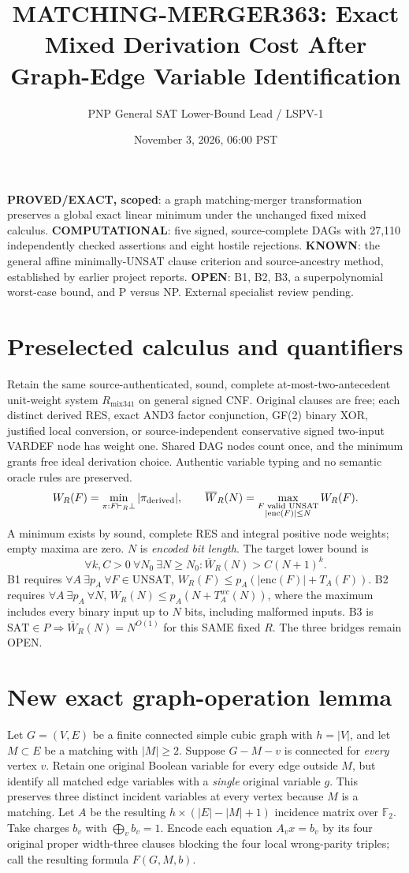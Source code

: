 \documentclass[11pt]{article}
\title{MATCHING-MERGER363: Exact Mixed Derivation Cost After Graph-Edge Variable Identification}
\author{PNP General SAT Lower-Bound Lead / LSPV-1}
\date{November 3, 2026, 06:00 PST}
\begin{document}
\maketitle
\noindent\textbf{PROVED/EXACT, scoped}: a graph matching-merger transformation preserves a global exact linear minimum under the unchanged fixed mixed calculus. \textbf{COMPUTATIONAL}: five signed, source-complete DAGs with 27,110 independently checked assertions and eight hostile rejections. \textbf{KNOWN}: the general affine minimally-UNSAT clause criterion and source-ancestry method, established by earlier project reports. \textbf{OPEN}: B1, B2, B3, a superpolynomial worst-case bound, and P versus NP. External specialist review pending.

\section*{Preselected calculus and quantifiers}
Retain the same source-authenticated, sound, complete at-most-two-antecedent unit-weight system \(R_{\mathrm{mix341}}\) on general signed CNF. Original clauses are free; each distinct derived RES, exact AND3 factor conjunction, GF(2) binary XOR, justified local conversion, or source-independent conservative signed two-input VARDEF node has weight one. Shared DAG nodes count once, and the minimum grants free ideal derivation choice. Authentic variable typing and no semantic oracle rules are preserved.
\[
 W_R(F)=\min_{\pi:F\vdash_R\bot}|\pi_{\rm derived}|,\qquad
 \overline W_R(N)=\max_{\substack{F\text{ valid UNSAT}\\|\mathrm{enc}(F)|\le N}}W_R(F).
\]
A minimum exists by sound, complete RES and integral positive node weights; empty maxima are zero. \(N\) is \emph{encoded bit length}. The target lower bound is
\[
 \forall k,C>0\ \forall N_0\ \exists N\ge N_0:
 \overline W_R(N)>C(N+1)^k.
\]
B1 requires \(\forall A\ \exists p_A\ \forall F\in\mathrm{UNSAT}\), \(W_R(F)\le p_A(|\mathrm{enc}(F)|+T_A(F))\). B2 requires \(\forall A\ \exists p_A\ \forall N\), \(\overline W_R(N)\le p_A(N+T_A^{wc}(N))\), where the maximum includes every binary input up to \(N\) bits, including malformed inputs. B3 is \(\mathrm{SAT}\in P\Longrightarrow\overline W_R(N)=N^{O(1)}\) for this SAME fixed \(R\). The three bridges remain OPEN.

\section*{New exact graph-operation lemma}
Let \(G=(V,E)\) be a finite connected simple cubic graph with \(h=|V|\), and let \(M\subset E\) be a matching with \(|M|\ge2\). Suppose \(G-M-v\) is connected for \emph{every} vertex \(v\). Retain one original Boolean variable for every edge outside \(M\), but identify all matched edge variables with a \emph{single} original variable \(g\). This preserves three distinct incident variables at every vertex because \(M\) is a matching. Let \(A\) be the resulting \(h\times(|E|-|M|+1)\) incidence matrix over \(\mathbb F_2\). Take charges \(b_v\) with \(\bigoplus_v b_v=1\). Encode each equation \(A_v x=b_v\) by its four original proper width-three clauses blocking the four local wrong-parity triples; call the resulting formula \(F(G,M,b)\).
\end{document}
